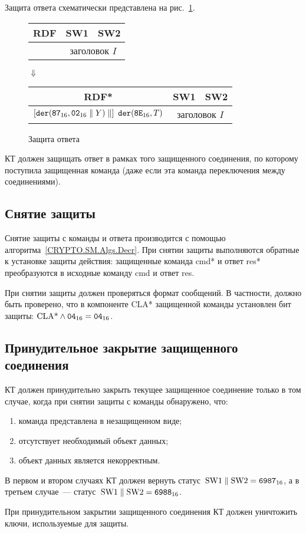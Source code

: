 Защита ответа схематически представлена на рис.~\ref{Fig.CMDS.ResEncr}. 

\begin{figure}[!h]
\begin{center}
\begin{tabular}{|c|c|c|}
\hline
RDF & SW1 & SW2 \\
\hline
\hline
[сообщение $X$] & \multicolumn{2}{|c|}{заголовок $I$} \\
\hline
\end{tabular}

\vskip3pt$\Downarrow$\vskip3pt

\begin{tabular}{|c|c|c|}
\hline
RDF* & SW1 & SW2 \\
\hline
\hline
$\left[\texttt{der}(\texttt{87}_{16},\texttt{02}_{16}\parallel Y)\parallel\right]\ \texttt{der}(\texttt{8E}_{16},T)$ & 
\multicolumn{2}{|c|}{заголовок $I$} \\
\hline
\end{tabular}
\end{center}
\caption{Защита ответа}\label{Fig.CMDS.ResEncr}
\end{figure}

КТ должен защищать ответ в рамках того защищенного соединения,
по которому поступила защищенная команда (даже если эта команда 
переключения между соединениями). 

\subsection{Снятие защиты}\label{CMDS.SM.Decr}

Снятие защиты с команды и ответа производится с помощью 
алгоритма~\ref{CRYPTO.SM.Algs.Decr}.  
При снятии защиты выполняются обратные к установке защиты действия: 
защищенные команда cmd* и ответ res* преобразуются в исходные команду cmd  
и ответ res.  

При снятии защиты должен проверяться формат сообщений.
В частности, должно быть проверено, что в компоненте CLA* 
защищенной команды установлен бит защиты:
$\text{CLA*}\wedge\texttt{04}_{16}=\texttt{04}_{16}$.

\subsection{Принудительное закрытие защищенного соединения}
\label{CMDS.SM.Stop}

КТ должен принудительно закрыть текущее защищенное соединение только в том 
случае, когда при снятии защиты с команды обнаружено, что: 
\begin{enumerate}
\item[1)] команда представлена в незащищенном виде;
\item[2)] отсутствует необходимый объект данных;
\item[3)] объект данных является некорректным.
\end{enumerate}

В первом и втором случаях КТ должен вернуть 
статус~$\text{SW1} \parallel \text{SW2} = \texttt{6987}_{16}$, 
а в третьем случае~--- статус~$\text{SW1} \parallel \text{SW2} = 
\texttt{6988}_{16}$.  

При принудительном закрытии защищенного соединения КТ должен уничтожить 
ключи, используемые для защиты. 
